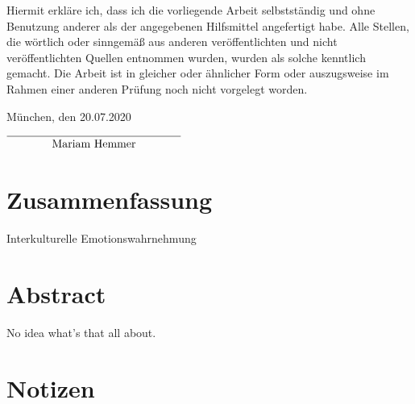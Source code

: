 \documentclass[11pt,a4paper,headsepline,twoside,toc=bibliography]{scrreprt}
\begin{document}
Hiermit erkläre ich, dass ich die vorliegende Arbeit selbstständig und ohne Benutzung anderer als der angegebenen Hilfsmittel angefertigt habe. Alle Stellen, die wörtlich oder sinngemäß aus anderen veröffentlichten und nicht veröffentlichten Quellen entnommen wurden, wurden als solche kenntlich gemacht. Die Arbeit ist in gleicher oder ähnlicher Form oder auszugsweise im Rahmen einer anderen Prüfung noch nicht vorgelegt worden.

\vphantom{M}

\noindent München, den 20.07.2020

\vphantom{M}

\vphantom{M}

\begin{flushright}
$\overline{~~~~~~~~~~~~\mbox{\strut Mariam Hemmer}~~~~~~~~~~~~}$
\end{flushright}


\chapter*{Zusammenfassung}

Interkulturelle Emotionswahrnehmung 

\chapter*{Abstract}
No idea what's that all about.

\cleardoublepage


\tableofcontents
\listoffigures
\listoftables
\listoftodos
\cleardoublepage



\chapter{Notizen}
\label{sec:general_notes}
\end{document}
